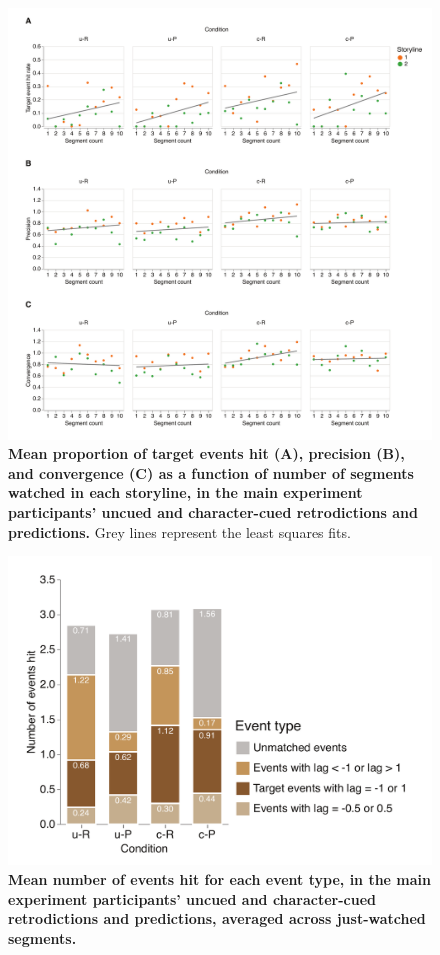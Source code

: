 \documentclass[10pt]{article}
\begin{document}
  \newpage




\begin{figure}[tp]
    \centering
    \includegraphics[width=\textwidth]{supp1.pdf}
    \caption{\textbf{Mean proportion of target events hit (A), precision (B), and convergence (C) as a function of number of segments watched in each storyline, in the main experiment participants' uncued and character-cued retrodictions and predictions.} Grey lines represent the least squares fits.}
    \label{fig:supp1}
\end{figure}

\begin{figure}[tp]
    \centering
    \includegraphics[width=\textwidth]{supp2.pdf}
    \caption{\textbf{Mean number of events hit for each event type, in the main experiment participants' uncued and character-cued retrodictions and predictions, averaged across just-watched segments.}}
    \label{fig:supp2}
\end{figure}
\end{document}
